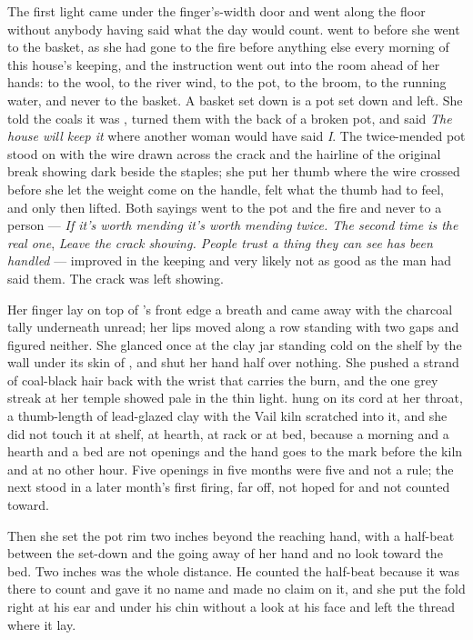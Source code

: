 \scenebreak

The first light came under the finger's-width door and went along the floor without anybody having said what the day would count.  went to  before she went to the basket, as she had gone to the fire before anything else every morning of this house's keeping, and the instruction went out into the room ahead of her hands: to the wool, to the river wind, to the pot, to the broom, to the running water, and never to the basket. A basket set down is a pot set down and left. She told the coals it was , turned them with the back of a broken pot, and said \emph{The house will keep it} where another woman would have said \emph{I}. The twice-mended pot stood on  with the wire drawn across the crack and the hairline of the original break showing dark beside the staples; she put her thumb where the wire crossed before she let the weight come on the handle, felt what the thumb had to feel, and only then lifted. Both sayings went to the pot and the fire and never to a person --- \emph{If it's worth mending it's worth mending twice. The second time is the real one}, \emph{Leave the crack showing. People trust a thing they can see has been handled} --- improved in the keeping and very likely not as good as the man had said them. The crack was left showing.

Her finger lay on top of 's front edge a breath and came away with the charcoal tally underneath unread; her lips moved along a row standing with two gaps and figured neither. She glanced once at the clay jar standing cold on the shelf by the wall under its skin of , and shut her hand half over nothing. She pushed a strand of coal-black hair back with the wrist that carries the burn, and the one grey streak at her temple showed pale in the thin light.  hung on its cord at her throat, a thumb-length of lead-glazed clay with the Vail kiln scratched into it, and she did not touch it at shelf, at hearth, at rack or at bed, because a morning and a hearth and a bed are not openings and the hand goes to the mark before the kiln and at no other hour. Five openings in five months were five and not a rule; the next stood in a later month's first firing, far off, not hoped for and not counted toward.

Then she set the pot rim two inches beyond the reaching hand, with a half-beat between the set-down and the going away of her hand and no look toward the bed. Two inches was the whole distance. He counted the half-beat because it was there to count and gave it no name and made no claim on it, and she put the fold right at his ear and under his chin without a look at his face and left the thread where it lay.

